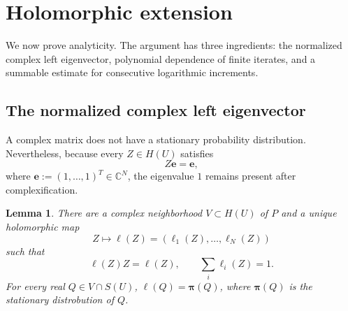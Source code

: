 \documentclass[11pt,a4paper]{amsart}
\newtheorem{lemma}[theorem]{Lemma}
\newcommand{\C}{\mathbb C}
\begin{document}
\section{Holomorphic extension}
\label{sec:direct}

We now prove analyticity. The argument has
three ingredients: the normalized complex left eigenvector, polynomial
dependence of finite iterates, and a summable estimate for consecutive
logarithmic increments.

\subsection{The normalized complex left eigenvector}

A complex matrix does not have a stationary probability distribution.
Nevertheless, because every \(Z\in H(U)\) satisfies
\[
 Z\mathbf{e}=\mathbf{e},
\]
where $\mathbf{e}:=(1,\ldots,1)^T\in\C^N$,  the eigenvalue \(1\) remains present after complexification.

\begin{lemma}\label{lem:direct-left-vector}
There are a complex neighborhood \(V\subset H(U)\) of \(P\) and a
unique holomorphic map
\[
 Z\longmapsto
 \boldsymbol\ell(Z)=(\ell_1(Z),\ldots,\ell_N(Z))
\]
such that
\[
 \boldsymbol\ell(Z)Z=\boldsymbol\ell(Z),
 \qquad
 \sum_i\ell_i(Z)=1.
\]
For every real \(Q\in V\cap S(U)\),
\(\boldsymbol\ell(Q)=\boldsymbol\pi(Q)\), where $\boldsymbol{\pi}(Q)$ is the stationary distrobution of $Q$.
\end{lemma}
\end{document}

